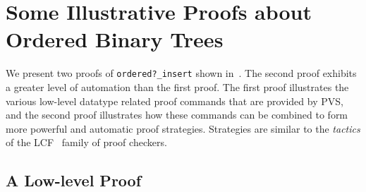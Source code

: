 \documentclass[11pt,twoside]{book}
\newcommand{\pvsref}[1]{\fbox{\footnotesize\ref{#1}}} \def\id#1{\hbox{\textt{#1}}} %
\begin{document}


\chapter{Some Illustrative Proofs about Ordered Binary Trees}
\label{OBT-proofs}

We present two proofs of \texttt{ordered?\_insert} shown in~\pvsref{ordered?_insert}\@.  The second proof
exhibits a greater level of automation than the first proof.  The first
proof illustrates the various low-level datatype related proof commands
that are 
provided by PVS, and the second proof illustrates how these commands
can be combined to form more powerful and automatic proof strategies.
Strategies
are similar to the \textit{tactics} of the LCF~\cite{LCF} family of proof
checkers.

\section{A Low-level Proof}
\end{document}
